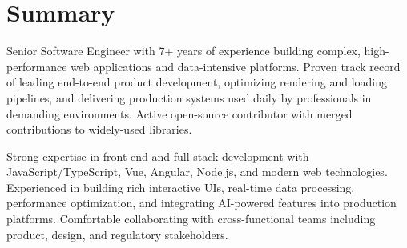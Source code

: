 
\section{Summary}
Senior Software Engineer with 7+ years of experience building complex, high-performance web applications and data-intensive platforms. Proven track record of leading end-to-end product development, optimizing rendering and loading pipelines, and delivering production systems used daily by professionals in demanding environments. Active open-source contributor with merged contributions to widely-used libraries.

\vspace{0.2cm}

Strong expertise in front-end and full-stack development with JavaScript/TypeScript, Vue, Angular, Node.js, and modern web technologies. Experienced in building rich interactive UIs, real-time data processing, performance optimization, and integrating AI-powered features into production platforms. Comfortable collaborating with cross-functional teams including product, design, and regulatory stakeholders.

